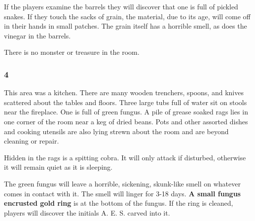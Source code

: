 \documentclass[palace_of_the_silver_princess]{subfiles}
\begin{document}
If the players examine the barrels they will discover that one is full
of pickled snakes. If they touch the sacks of grain, the material, due
to its age, will come off in their hands in small patches. The grain
itself has a horrible smell, as does the vinegar in the barrels.

There is no monster or treasure in the room.

\subsubsection{4}

\begin{quotebox}
    This area was a kitchen. There are many wooden trenchers, spoons,
    and knives scattered about the tables and floors. Three large tubs
    full of water sit on stools near the fireplace. One is full of green
    fungus. A pile of grease soaked rags lies in one corner of the room
    near a keg of dried beans. Pots and other assorted dishes and
    cooking utensils are also lying strewn about the room and are beyond
    cleaning or repair.
\end{quotebox}

Hidden in the rags is a spitting cobra.  It will only attack if
disturbed, otherwise it will remain quiet as it is sleeping.

The green fungus will leave a horrible, sickening, skunk-like smell on
whatever comes in contact with it. The smell will linger for 3-18 days.
\textbf{A small fungus encrusted gold ring} is at the bottom of the
fungus. If the ring is cleaned, players will discover the initials A. E.
S. carved into it.
\end{document}
